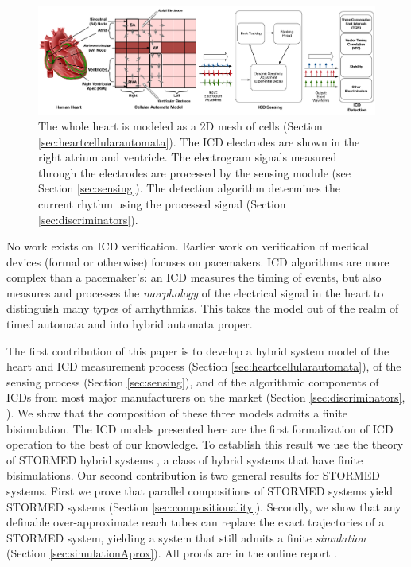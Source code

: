 \begin{figure}[t]
	\centering
	\vspace{-10pt}
	\includegraphics[scale=0.28]{figures/overviewFigure}
	\vspace{-10pt}
	\caption{\small The whole heart is modeled as a 2D mesh of cells (Section \ref{sec:heartcellularautomata}). The \ac{ICD} electrodes are shown in the right atrium and ventricle. The electrogram signals measured through the electrodes are processed by the sensing module (see Section \ref{sec:sensing}). The detection algorithm determines the current rhythm using the processed signal (Section \ref{sec:discriminators}).}
	\label{fig:overview}
	\vspace{-10pt}
\end{figure}
No work exists on \ac{ICD} verification. 
Earlier work on verification of medical devices (formal or otherwise) focuses on pacemakers.
\ac{ICD} algorithms are more complex than a pacemaker's: an \ac{ICD} measures the timing of events, but also measures and processes the \emph{morphology} of the electrical signal in the heart to distinguish many types of arrhythmias.
This takes the model out of the realm of timed automata and into hybrid automata proper.

The first contribution of this paper is to develop a hybrid system model of the heart and \ac{ICD} measurement process (Section \ref{sec:heartcellularautomata}), 
of the sensing process (Section \ref{sec:sensing}),
and of the algorithmic components of \acp{ICD} from most major manufacturers on the market (Section \ref{sec:discriminators}, ).
We show that the composition of these three models admits a finite bisimulation.
The \ac{ICD} models presented here are the first formalization of \ac{ICD} operation to the best of our knowledge.
To establish this result we use the theory of STORMED hybrid systems \cite{VladimerouPVD08_STORMED}, a class of hybrid systems that have finite bisimulations.
Our second contribution is two general results for STORMED systems.
First we prove that parallel compositions of STORMED systems yield STORMED systems (Section \ref{sec:compositionality}).
Secondly, we show that any definable over-approximate reach tubes can replace the exact trajectories of a STORMED system, yielding a system that still admits a finite \emph{simulation} (Section \ref{sec:simulationAprox}). 
All proofs are in the online report \cite{AbbasJJM16_ICDTechRpt}.
